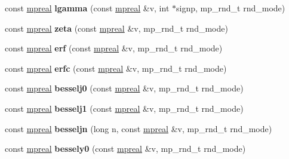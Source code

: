\begin{DoxyCompactItemize}
const \hyperlink{classmpfr_1_1mpreal}{mpreal} {\bfseries lgamma} (const \hyperlink{classmpfr_1_1mpreal}{mpreal} \&v, int $\ast$signp, mp\+\_\+rnd\+\_\+t rnd\+\_\+mode)
\item 
\mbox{\label{classmpfr_1_1mpreal_af22889e1fbd93f0e0de9fe9a5aaff66f}} 
const \hyperlink{classmpfr_1_1mpreal}{mpreal} {\bfseries zeta} (const \hyperlink{classmpfr_1_1mpreal}{mpreal} \&v, mp\+\_\+rnd\+\_\+t rnd\+\_\+mode)
\item 
\mbox{\label{classmpfr_1_1mpreal_a14db9a3ecbada0b2a5460e4438e4927a}} 
const \hyperlink{classmpfr_1_1mpreal}{mpreal} {\bfseries erf} (const \hyperlink{classmpfr_1_1mpreal}{mpreal} \&v, mp\+\_\+rnd\+\_\+t rnd\+\_\+mode)
\item 
\mbox{\label{classmpfr_1_1mpreal_afdd635eaa7eaa91800cfee95948926bd}} 
const \hyperlink{classmpfr_1_1mpreal}{mpreal} {\bfseries erfc} (const \hyperlink{classmpfr_1_1mpreal}{mpreal} \&v, mp\+\_\+rnd\+\_\+t rnd\+\_\+mode)
\item 
\mbox{\label{classmpfr_1_1mpreal_ac621d3c47fe08e541bdfdf683591584b}} 
const \hyperlink{classmpfr_1_1mpreal}{mpreal} {\bfseries besselj0} (const \hyperlink{classmpfr_1_1mpreal}{mpreal} \&v, mp\+\_\+rnd\+\_\+t rnd\+\_\+mode)
\item 
\mbox{\label{classmpfr_1_1mpreal_a0f2d0579979b0debfe5df092b0c74920}} 
const \hyperlink{classmpfr_1_1mpreal}{mpreal} {\bfseries besselj1} (const \hyperlink{classmpfr_1_1mpreal}{mpreal} \&v, mp\+\_\+rnd\+\_\+t rnd\+\_\+mode)
\item 
\mbox{\label{classmpfr_1_1mpreal_a17832cc4a85391f9c717b13a35fd9b37}} 
const \hyperlink{classmpfr_1_1mpreal}{mpreal} {\bfseries besseljn} (long n, const \hyperlink{classmpfr_1_1mpreal}{mpreal} \&v, mp\+\_\+rnd\+\_\+t rnd\+\_\+mode)
\item 
\mbox{\label{classmpfr_1_1mpreal_a7f58635ca88d077d049ceab6d6af9a79}} 
const \hyperlink{classmpfr_1_1mpreal}{mpreal} {\bfseries bessely0} (const \hyperlink{classmpfr_1_1mpreal}{mpreal} \&v, mp\+\_\+rnd\+\_\+t rnd\+\_\+mode)
\item 
\mbox{\label{classmpfr_1_1mpreal_aee1c2c077a97dcb04625a598c2fbffac}} 

\end{DoxyCompactItemize}
